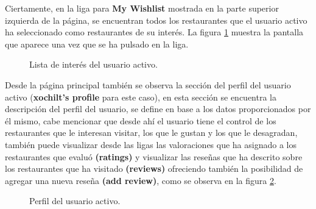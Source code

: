 \documentclass[12pt,letterpaper,oneside] {memoir}
\begin{document}
Ciertamente, en la liga para \textbf{My Wishlist} mostrada en la parte superior izquierda de la página, se encuentran todos los restaurantes que el usuario activo ha seleccionado como restaurantes de su interés. La figura \ref{fig:p5} muestra la pantalla que aparece una vez que se ha pulsado en la liga.\\

\begin{figure}[H]
\centering 
{} \caption{Lista de interés del usuario activo.} 
\label{fig:p5} 
\end{figure}

Desde la página principal también se observa la sección del perfil del usuario activo (\textbf{xochilt’s profile} para este caso), en esta sección se encuentra la descripción del perfil del usuario, se define en base a los datos proporcionados por él mismo, cabe mencionar que desde ahí el usuario tiene el control de los restaurantes que le interesan visitar, los que le gustan y los que le desagradan, también puede visualizar desde las ligas las valoraciones que ha asignado a los restaurantes que evaluó \textbf{(ratings)} y visualizar las reseñas que ha descrito sobre los restaurantes que ha visitado \textbf{(reviews)} ofreciendo también la posibilidad de agregar una nueva reseña \textbf{(add review)}, como se observa en la figura \ref{fig:p6}.

\begin{figure}[H]
\centering 
{} \caption{Perfil del usuario activo.} 
\label{fig:p6} 
\end{figure}
\end{document}
